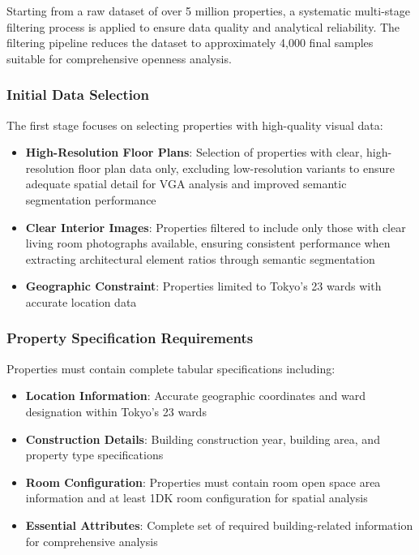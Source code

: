 Starting from a raw dataset of over 5 million properties, a systematic multi-stage filtering process is applied to ensure data quality and analytical reliability. The filtering pipeline reduces the dataset to approximately 4,000 final samples suitable for comprehensive openness analysis.

\subsubsection{Initial Data Selection}

The first stage focuses on selecting properties with high-quality visual data:

\begin{itemize}
    \item \textbf{High-Resolution Floor Plans}: Selection of properties with clear, high-resolution floor plan data only, excluding low-resolution variants to ensure adequate spatial detail for VGA analysis and improved semantic segmentation performance
    \item \textbf{Clear Interior Images}: Properties filtered to include only those with clear living room photographs available, ensuring consistent performance when extracting architectural element ratios through semantic segmentation
    \item \textbf{Geographic Constraint}: Properties limited to Tokyo's 23 wards with accurate location data
\end{itemize}

\subsubsection{Property Specification Requirements}

Properties must contain complete tabular specifications including:

\begin{itemize}
    \item \textbf{Location Information}: Accurate geographic coordinates and ward designation within Tokyo's 23 wards
    \item \textbf{Construction Details}: Building construction year, building area, and property type specifications
    \item \textbf{Room Configuration}: Properties must contain room open space area information and at least 1DK room configuration for spatial analysis
    \item \textbf{Essential Attributes}: Complete set of required building-related information for comprehensive analysis
\end{itemize}

